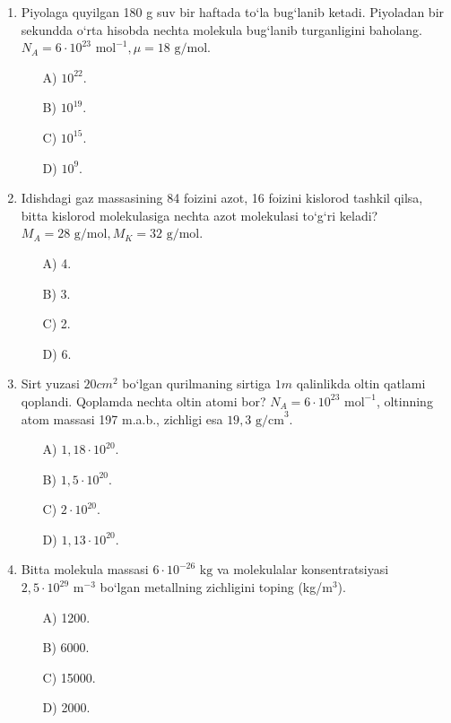 \begin{enumerate}
\begin{itemize}
    \end{itemize}

    \item Piyolaga quyilgan 180 g suv bir haftada to‘la bug‘lanib ketadi. Piyoladan bir sekundda o‘rta hisobda nechta molekula bug‘lanib turganligini baholang. $N_A = 6 \cdot 10^{23} \text{ mol}^{-1}, \mu = 18 \text{ g/mol}$.
    \begin{itemize}
        \item[A)] $10^{22}$.
        \item[B)] $10^{19}$.
        \item[C)] $10^{15}$.
        \item[D)] $10^9$.
        
    \end{itemize}

    \item Idishdagi gaz massasining 84 foizini azot, 16 foizini kislorod tashkil qilsa, bitta kislorod molekulasiga nechta azot molekulasi to‘g‘ri keladi? $M_A = 28 \text{ g/mol}, M_K = 32 \text{ g/mol}$.
    \begin{itemize}
        \item[A)] 4.
        \item[B)] 3.
        \item[C)] 2.
        \item[D)] 6.
       
    \end{itemize}

    \item Sirt yuzasi $20 cm^2$ bo‘lgan qurilmaning sirtiga $1m$ qalinlikda oltin qatlami qoplandi. Qoplamda nechta oltin atomi bor? $N_A = 6 \cdot 10^{23} \text{ mol}^{-1}$, oltinning atom massasi 197 m.a.b., zichligi esa $19,3 \text{ g/cm}^3$.
    \begin{itemize}
        \item[A)] $1,18 \cdot 10^{20}$.
        \item[B)] $1,5 \cdot 10^{20}$.
        \item[C)] $2 \cdot 10^{20}$.
        \item[D)] $1,13 \cdot 10^{20}$.
        
    \end{itemize}

    \item Bitta molekula massasi $6 \cdot 10^{-26} \text{ kg}$ va molekulalar konsentratsiyasi $2,5 \cdot 10^{29} \text{ m}^{-3}$ bo‘lgan metallning zichligini toping (kg/m$^3$).
    \begin{itemize}
        \item[A)] 1200.
        \item[B)] 6000.
        \item[C)] 15000.
        \item[D)] 2000.
       

\end{itemize}
\end{enumerate}
